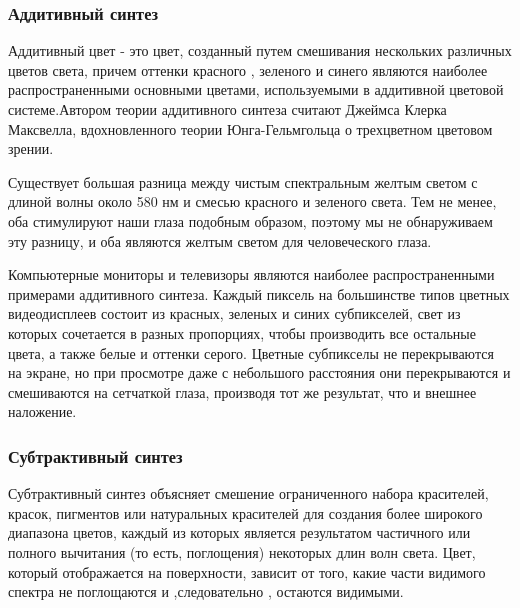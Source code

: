 \subsubsection{Аддитивный синтез}
Аддитивный цвет - это цвет, созданный путем смешивания нескольких различных цветов света, причем оттенки красного , зеленого и синего являются наиболее распространенными основными цветами, используемыми в аддитивной цветовой системе.Автором теории аддитивного синтеза считают Джеймса Клерка Максвелла, вдохновленного теории Юнга-Гельмгольца о трехцветном цветовом зрении.

\begin{figure}[ht!]
\end{figure}

Существует большая разница между чистым спектральным желтым светом с длиной волны около 580 нм и смесью красного и зеленого света. Тем не менее, оба стимулируют наши глаза подобным образом, поэтому мы не обнаруживаем эту разницу, и оба являются желтым светом для человеческого глаза. 


Компьютерные мониторы и телевизоры являются наиболее распространенными примерами аддитивного синтеза. Каждый пиксель на большинстве типов цветных видеодисплеев состоит из красных, зеленых и синих субпикселей, свет из которых сочетается в разных пропорциях, чтобы производить все остальные цвета, а также белые и оттенки серого. Цветные субпикселы не перекрываются на экране, но при просмотре даже с небольшого  расстояния они перекрываются и смешиваются на сетчаткой глаза, производя тот же результат, что и внешнее наложение.


\subsubsection{Субтрактивный синтез}
Субтрактивный синтез объясняет смешение ограниченного набора красителей, красок, пигментов или натуральных красителей для создания более широкого диапазона цветов, каждый из которых является результатом частичного или полного вычитания (то есть, поглощения) некоторых длин волн света. Цвет, который отображается на поверхности, зависит от того, какие части видимого спектра не поглощаются и ,следовательно , остаются видимыми.

